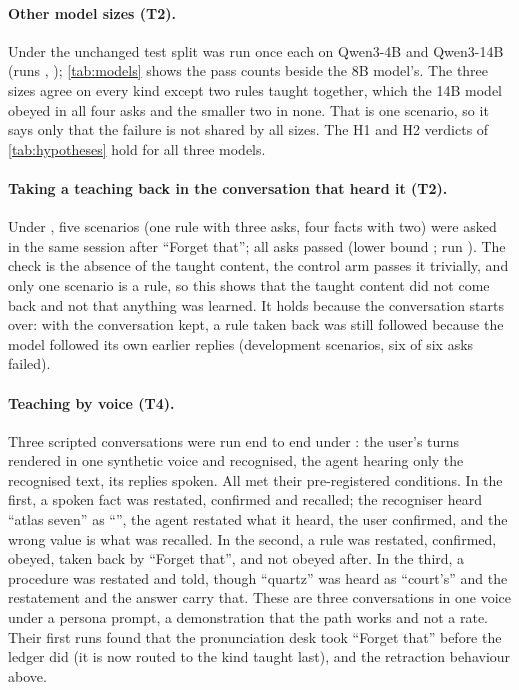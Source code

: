 \paragraph{Other model sizes (T2).}
Under  the unchanged test split was run once each on Qwen3-4B and Qwen3-14B (runs , ); \cref{tab:models} shows the pass counts beside the 8B model's. The three sizes agree on every kind except two rules taught together, which the 14B model obeyed in all four asks and the smaller two in none.
That is one scenario, so it says only that the failure is not shared by all sizes. The H1 and H2 verdicts of \cref{tab:hypotheses} hold for all three models.

\begin{table}[t]
\centering\small

\caption{Taught asks that pass, by kind, on the three model sizes (the same test split, one run each).}
\label{tab:models}
\end{table}

\paragraph{Taking a teaching back in the conversation that heard it (T2).}
Under , five scenarios (one rule with three asks, four facts with two) were asked in the same session after ``Forget that''; all \RetractPassed{} asks passed (lower bound \RetractLow{}; run ). The check is the absence of the taught content, the control arm passes it
trivially, and only one scenario is a rule, so this shows that the taught content did not come back and not that anything was learned. It holds because the conversation starts over: with the conversation kept, a rule taken back was still followed because the model followed its own earlier replies (development scenarios, six of six asks failed).

\paragraph{Teaching by voice (T4).}
Three scripted conversations were run end to end under : the user's turns rendered in one synthetic voice and recognised, the agent hearing only the recognised text, its replies spoken. All \SpokenPassed{} met their pre-registered conditions. In the first, a spoken fact was restated, confirmed and recalled; the recogniser heard ``atlas seven'' as ``\SpokenHeardServer{}'', the agent restated what it heard, the user confirmed, and the wrong value is what was recalled. In the second, a rule was
restated, confirmed, obeyed, taken back by ``Forget that'', and not obeyed after. In the third, a procedure was restated and told, though ``quartz'' was heard as ``court's'' and the restatement and the answer carry that. These are three conversations in one voice under a persona prompt, a demonstration that the path works and not a rate. Their first runs found
that the pronunciation desk took ``Forget that'' before the ledger did (it is now routed to the kind taught last), and the retraction behaviour above.

